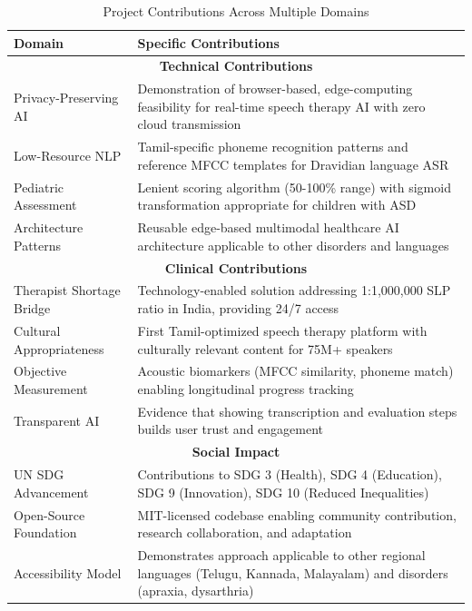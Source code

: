 \documentclass[12pt,a4paper]{article}
\begin{document}
\begin{table}[H]
\centering
\caption{Project Contributions Across Multiple Domains}
\label{tab:contributions}
\small
\begin{tabular}{p{4cm}p{9.5cm}}
\toprule
\textbf{Domain} & \textbf{Specific Contributions} \\
\midrule
\multicolumn{2}{c}{\textbf{Technical Contributions}} \\
\midrule
Privacy-Preserving AI & Demonstration of browser-based, edge-computing feasibility for real-time speech therapy AI with zero cloud transmission \\
\hline
Low-Resource NLP & Tamil-specific phoneme recognition patterns and reference MFCC templates for Dravidian language ASR \\
\hline
Pediatric Assessment & Lenient scoring algorithm (50-100\% range) with sigmoid transformation appropriate for children with ASD \\
\hline
Architecture Patterns & Reusable edge-based multimodal healthcare AI architecture applicable to other disorders and languages \\
\midrule
\multicolumn{2}{c}{\textbf{Clinical Contributions}} \\
\midrule
Therapist Shortage Bridge & Technology-enabled solution addressing 1:1,000,000 SLP ratio in India, providing 24/7 access \\
\hline
Cultural Appropriateness & First Tamil-optimized speech therapy platform with culturally relevant content for 75M+ speakers \\
\hline
Objective Measurement & Acoustic biomarkers (MFCC similarity, phoneme match) enabling longitudinal progress tracking \\
\hline
Transparent AI & Evidence that showing transcription and evaluation steps builds user trust and engagement \\
\midrule
\multicolumn{2}{c}{\textbf{Social Impact}} \\
\midrule
UN SDG Advancement & Contributions to SDG 3 (Health), SDG 4 (Education), SDG 9 (Innovation), SDG 10 (Reduced Inequalities) \\
\hline
Open-Source Foundation & MIT-licensed codebase enabling community contribution, research collaboration, and adaptation \\
\hline
Accessibility Model & Demonstrates approach applicable to other regional languages (Telugu, Kannada, Malayalam) and disorders (apraxia, dysarthria) \\
\bottomrule
\end{tabular}
\end{table}
\end{document}
